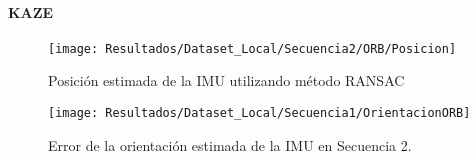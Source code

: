 \paragraph{KAZE}


\begin{figure}[H]
	\centering
	\texttt{[image: Resultados/Dataset\_Local/Secuencia2/ORB/Posicion]}
	\caption{Posición estimada de la IMU utilizando método RANSAC}
	\label{imagen:Resultados/Dataset_Local/Secuencia2/KAZE/Posicion}
\end{figure}


\begin{figure}[H]
	\centering
	\texttt{[image: Resultados/Dataset\_Local/Secuencia1/OrientacionORB]}
	\caption[Error de la orientación estimada  de la IMU en Secuencia 2 utilizando el método RANSAC]{Error de la orientación estimada  de la IMU en Secuencia 2.}
	\label{imagen:Resultados/Dataset_Local/Secuencia2/KAZE/Orientacion}
\end{figure}


%
%
%
%
%
%
%
%
%
%
%
%
%
